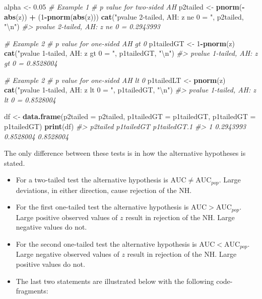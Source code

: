 \documentclass[
]{book}
\newenvironment{Shaded}{\begin{snugshade}}{\end{snugshade}}
\newcommand{\CharTok}[1]{\textcolor[rgb]{0.31,0.60,0.02}{#1}}
\newcommand{\CommentTok}[1]{\textcolor[rgb]{0.56,0.35,0.01}{\textit{#1}}}
\newcommand{\DataTypeTok}[1]{\textcolor[rgb]{0.13,0.29,0.53}{#1}}
\newcommand{\DecValTok}[1]{\textcolor[rgb]{0.00,0.00,0.81}{#1}}
\newcommand{\FloatTok}[1]{\textcolor[rgb]{0.00,0.00,0.81}{#1}}
\newcommand{\KeywordTok}[1]{\textcolor[rgb]{0.13,0.29,0.53}{\textbf{#1}}}
\newcommand{\NormalTok}[1]{#1}
\newcommand{\OperatorTok}[1]{\textcolor[rgb]{0.81,0.36,0.00}{\textbf{#1}}}
\newcommand{\StringTok}[1]{\textcolor[rgb]{0.31,0.60,0.02}{#1}}
\providecommand{\tightlist}{%
  \setlength{\itemsep}{0pt}\setlength{\parskip}{0pt}}
\begin{document}
\begin{Shaded}
\begin{Highlighting}[]
\NormalTok{alpha  \textless{}{-}}\StringTok{ }\FloatTok{0.05}
\CommentTok{\# Example 1}
\CommentTok{\# p value for two{-}sided AH}
\NormalTok{p2tailed \textless{}{-}}\StringTok{ }\KeywordTok{pnorm}\NormalTok{(}\OperatorTok{{-}}\KeywordTok{abs}\NormalTok{(z)) }\OperatorTok{+}\StringTok{ }\NormalTok{(}\DecValTok{1}\OperatorTok{{-}}\KeywordTok{pnorm}\NormalTok{(}\KeywordTok{abs}\NormalTok{(z))) }
\KeywordTok{cat}\NormalTok{(}\StringTok{"pvalue 2{-}tailed, AH: z ne 0 = "}\NormalTok{, p2tailed, }\StringTok{"}\CharTok{\textbackslash{}n}\StringTok{"}\NormalTok{)}
\CommentTok{\#\textgreater{} pvalue 2{-}tailed, AH: z ne 0 =  0.2943993}

\CommentTok{\# Example 2}
\CommentTok{\# p value for one{-}sided AH gt 0}
\NormalTok{p1tailedGT \textless{}{-}}\StringTok{ }\DecValTok{1}\OperatorTok{{-}}\KeywordTok{pnorm}\NormalTok{(z) }
\KeywordTok{cat}\NormalTok{(}\StringTok{"pvalue 1{-}tailed, AH: z gt 0 = "}\NormalTok{, p1tailedGT, }\StringTok{"}\CharTok{\textbackslash{}n}\StringTok{"}\NormalTok{)}
\CommentTok{\#\textgreater{} pvalue 1{-}tailed, AH: z gt 0 =  0.8528004}

\CommentTok{\# Example 2}
\CommentTok{\# p value for one{-}sided AH lt 0 }
\NormalTok{p1tailedLT \textless{}{-}}\StringTok{ }\KeywordTok{pnorm}\NormalTok{(z)}
\KeywordTok{cat}\NormalTok{(}\StringTok{"pvalue 1{-}tailed, AH: z lt 0 = "}\NormalTok{, p1tailedGT, }\StringTok{"}\CharTok{\textbackslash{}n}\StringTok{"}\NormalTok{)}
\CommentTok{\#\textgreater{} pvalue 1{-}tailed, AH: z lt 0 =  0.8528004}

\NormalTok{df \textless{}{-}}\StringTok{ }\KeywordTok{data.frame}\NormalTok{(}\DataTypeTok{p2tailed =}\NormalTok{ p2tailed,}
                 \DataTypeTok{p1tailedGT =}\NormalTok{ p1tailedGT,}
                 \DataTypeTok{p1tailedGT =}\NormalTok{ p1tailedGT)}
\KeywordTok{print}\NormalTok{(df)}
\CommentTok{\#\textgreater{}    p2tailed p1tailedGT p1tailedGT.1}
\CommentTok{\#\textgreater{} 1 0.2943993  0.8528004    0.8528004}
\end{Highlighting}
\end{Shaded}

The only difference between these tests is in how the alternative hypotheses is stated.

\begin{itemize}
\tightlist
\item
  For a two-tailed test the alternative hypothesis is \(\text{AUC} \ne \text{AUC}_{pop}\). Large deviations, in either direction, cause rejection of the NH.
\item
  For the first one-tailed test the alternative hypothesis is \(\text{AUC} > \text{AUC}_{pop}\). Large positive observed values of \(z\) result in rejection of the NH. Large negative values do not.
\item
  For the second one-tailed test the alternative hypothesis is \(\text{AUC} < \text{AUC}_{pop}\). Large negative observed values of \(z\) result in rejection of the NH. Large positive values do not.
\item
  The last two statements are illustrated below with the following code-fragments:
\end{itemize}
\end{document}
